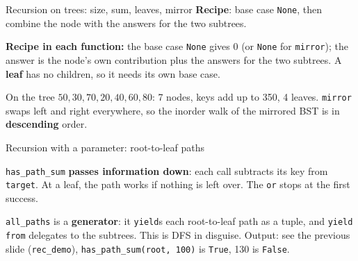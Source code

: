 \documentclass[aspectratio=169,10pt]{beamer}
\newcommand{\fA}{white}\newcommand{\fB}{white}\newcommand{\fC}{white}\newcommand{\fD}{white}
\newcommand{\fE}{white}\newcommand{\fF}{white}\newcommand{\fG}{white}
\newcommand{\bsttree}[7]{%
  \node[tn,fill=\fA] (a) at (0,0) {#1};
  \node[tn,fill=\fB] (b) at (-2,-1.15) {#2};  \node[tn,fill=\fC] (c) at (2,-1.15) {#3};
  \node[tn,fill=\fD] (d) at (-3,-2.3) {#4};   \node[tn,fill=\fE] (e) at (-1,-2.3) {#5};
  \node[tn,fill=\fF] (f) at (1,-2.3) {#6};    \node[tn,fill=\fG] (g) at (3,-2.3) {#7};
  \foreach \p/\q in {a/b,a/c,b/d,b/e,c/f,c/g}{\draw[tdInk!60] (\p) -- (\q);}}
\begin{document}
\begin{frame}[allowframebreaks]{Recursion on trees: size, sum, leaves, mirror}
\pycode[\fontsize{7.4}{8.8}\selectfont]{rec_size}
\vspace{1mm}
\pycode[\fontsize{7.4}{8.8}\selectfont]{rec_total}
\vspace{1mm}
\pycode[\fontsize{7.4}{8.8}\selectfont]{rec_leaves}
\vspace{1mm}
\pycode[\fontsize{7.4}{8.8}\selectfont]{rec_mirror}
\vspace{2mm}
{\small \textbf{Recipe}: base case \texttt{None}, then combine the node with the answers for the two subtrees.}
\framebreak
{}
\vspace{2mm}
{\small
\textbf{Recipe in each function:} the base case \texttt{None} gives $0$ (or \texttt{None} for \texttt{mirror}); the answer is the node's own contribution plus the answers for the two subtrees. A \textbf{leaf} has no children, so it needs its own base case.

\vspace{2mm}
On the tree $50,30,70,20,40,60,80$: 7 nodes, keys add up to 350, 4 leaves. \texttt{mirror} swaps left and right everywhere, so the inorder walk of the mirrored BST is in \textbf{descending} order.}
\end{frame}

\begin{frame}[allowframebreaks]{Recursion with a parameter: root-to-leaf paths}
\begin{sfig}[0.38]
\end{sfig}
\framebreak
{}
\vspace{2mm}
{\small
\texttt{has\_path\_sum} \textbf{passes information down}: each call subtracts its key from \texttt{target}. At a leaf, the path works if nothing is left over. The \texttt{or} stops at the first success.

\vspace{2mm}
\texttt{all\_paths} is a \textbf{generator}: it \texttt{yield}s each root-to-leaf path as a tuple, and \texttt{yield from} delegates to the subtrees. This is DFS in disguise. Output: see the previous slide (\texttt{rec\_demo}), \texttt{has\_path\_sum(root, 100)} is \texttt{True}, 130 is \texttt{False}.}
\end{frame}
\end{document}
